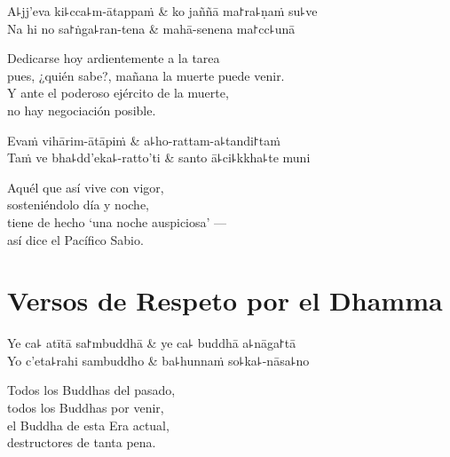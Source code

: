 \begin{twochants}
  A꜕jj'eva ki꜕cca꜕m-ātappaṁ & ko jaññā ma꜓ra꜕ṇaṁ su꜕ve \\
  Na hi no sa꜓ṅga꜕ran-tena & mahā-senena ma꜓cc꜕unā \\
\end{twochants}

\begin{english}
  Dedicarse hoy ardientemente a la tarea\\
  pues, ¿quién sabe?, mañana la muerte puede venir.\\
  Y ante el poderoso ejército de la muerte,\\
  no hay negociación posible.
\end{english}

\clearpage

\begin{twochants}
  Evaṁ vihārim-ātāpiṁ & a꜕ho-rattam-a꜕tandi꜓taṁ \\
  Taṁ ve bha꜕dd'eka꜕-ratto'ti & santo ā꜕ci꜕kkha꜕te muni \\
\end{twochants}

\begin{english}
  Aquél que así vive con vigor,\\
  sosteniéndolo día y noche,\\
  tiene de hecho `una noche auspiciosa’ ---\\
  así dice el Pacífico Sabio.
\end{english}

\chapter{Versos de Respeto por el Dhamma}


\begin{leader}
\end{leader}

\begin{twochants}
  Ye ca꜕ atītā sa꜓mbuddhā & ye ca꜕ buddhā a꜕nāga꜓tā \\
  Yo c'eta꜕rahi sambuddho & ba꜕hunnaṁ so꜕ka꜕-nāsa꜕no \\
\end{twochants}

\begin{english}
  Todos los Buddhas del pasado,\\
  todos los Buddhas por venir,\\
  el Buddha de esta Era actual,\\
  destructores de tanta pena.
\end{english}

